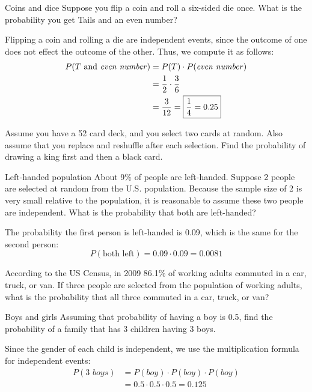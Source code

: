 \begin{example}[https://www.youtube.com/watch?v=twQYgbDkgro]{Coins and dice}
Suppose you flip a coin and roll a six-sided die once. What is the probability you get Tails and an even number?  

\sol
Flipping a coin and rolling a die are independent events, since the outcome of one does not effect the outcome of the other. Thus, we compute it as follows:
\begin{align*}
P(T \mbox{ and } \mbox{\emph{even number}}) &= P(T) \cdot P(\mbox{\emph{even number}})\\
&= \frac{1}{2} \cdot \frac{3}{6}\\
&= \frac{3}{12} = \boxed{\frac{1}{4} = 0.25}
\end{align*}
\end{example}

\begin{try}
Assume you have a 52 card deck, and you select two cards at random. Also
assume that you replace and reshuffle after each selection. Find the probability of drawing a king first and then a black card.
\end{try}

\begin{example}[https://www.youtube.com/watch?v=GL_EhwQq-98]{Left-handed population}
About 9\% of people are left-handed. Suppose 2 people are selected at random from the U.S. population. Because the sample size of 2 is
very small relative to the population, it is reasonable to assume these two people are independent. What is the probability that both are left-handed? 

\solline
The probability the first person is left-handed is 0.09, which is the same for the second person: \[P(\textrm{both left}) = 0.09 \cdot 0.09  = \boxed{0.0081} \]
\end{example}

\begin{try}
According to the US Census, in 2009 86.1\% of working adults commuted in a car, truck, or van. If three people are selected from the population of working adults, what is the probability that all three commuted in a car, truck, or van?
\end{try}

\begin{example}[https://www.youtube.com/watch?v=670VxNZAcP8]{Boys and girls}
Assuming that probability of having a boy is 0.5, find the probability of a family that has 3 children having 3 boys. 

\sol
Since the gender of each child is independent, we use the multiplication formula for independent events:
\begin{align*}
P(\mbox{3 } boys ) &= P(boy) \cdot P(boy) \cdot P(boy)\\
&= 0.5 \cdot 0.5 \cdot 0.5 = \boxed{0.125}
\end{align*}
\end{example}

